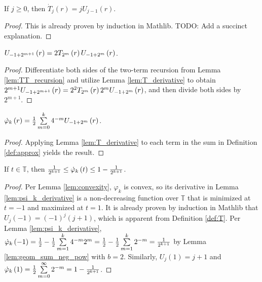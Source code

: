 \begin{lemma}[]
  \label{lem:T_derivative}
  \leanok
  If $j \geq 0$, then $\dot{T}_j\left(r\right) = j U_{j - 1}\left(r\right)$.
\end{lemma}
\begin{proof}
  \leanok
  This is already proven by induction in Mathlib. TODO: Add a succinct explanation.
\end{proof}

\begin{lemma}
  \label{lem:U_composition}
  $U_{-1 + 2^{m + 1}}\left(r\right) = 2 \TT[r]{m} U_{-1 + 2^m}\left(r\right)$.
\end{lemma}
\begin{proof}
  Differentiate both sides of the two-term recursion from Lemma \ref{lem:TT_recursion} and utilize Lemma \ref{lem:T_derivative} to obtain $2^{m + 1} U_{-1 + 2^{m + 1}}\left(r\right) = 2^2\TT[r]{m} 2^m U_{-1 + 2^m}\left(r\right)$, and then divide both sides by $2^{m + 1}$.
\end{proof}

\begin{lemma}
  \label{lem:psi_k_derivative}
  $\dotvarphi[r]{k} = \frac{1}{2} \sum\limits_{m = 0}^k 4^{-m} U_{-1 + 2^m}\left(r\right)$.
\end{lemma}
\begin{proof}
  Applying Lemma \ref{lem:T_derivative} to each term in the sum in Definition \ref{def:approx} yields the result.
\end{proof}

\begin{lemma}[]
  \label{lem:derivative_bounds}
   If $t \in \mathbb{T}$, then $\frac{1}{2^{k + 1}} \leq \dotvarphi[t]{k} \leq 1 - \frac{1}{2^{k + 1}}$.
\end{lemma}
\begin{proof}
  Per Lemma \ref{lem:convexity}, $\varphi_k$ is convex, so its derivative in Lemma \ref{lem:psi_k_derivative} is a non-decreasing function over $\mathbb{T}$ that is minimized at $t = -1$ and maximized at $t = 1$. It is already proven by induction in Mathlib that $U_j\left(-1\right) = \left(-1\right)^j \left(j + 1\right)$, which is apparent from Definition \ref{def:T}. Per Lemma \ref{lem:psi_k_derivative}, $\dotvarphi{k}\left(-1\right) = \frac{1}{2} - \frac{1}{2} \sum\limits_{m = 1}^k 4^{-m} 2^m = \frac{1}{2} - \frac{1}{2} \sum\limits_{m = 1}^k 2^{-m} = \frac{1}{2^{k + 1}}$ by Lemma \ref{lem:geom_sum_neg_pow} with $b = 2$. Similarly, $U_j\left(1\right) = j + 1$ and $\dotvarphi{k}\left(1\right) = \frac{1}{2} \sum\limits_{m = 0}^\infty 2^{-m} = 1 - \frac{1}{2^{k + 1}}$.
\end{proof}


